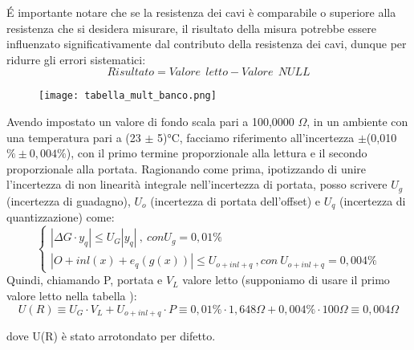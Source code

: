 \'E importante notare che se la resistenza dei cavi è comparabile o superiore alla resistenza che si desidera misurare, il risultato della misura potrebbe essere influenzato significativamente dal contributo della resistenza dei cavi, dunque per ridurre gli errori sistematici:
\begin{equation*}
    Risultato = Valore \ \ letto - Valore\ \ NULL
\end{equation*}

\begin{figure}[h]
    \centering
    \texttt{[image: tabella\_mult\_banco.png]}
    \label{fig:tab_mult_banco}
\end{figure}
\FloatBarrier

Avendo impostato un valore di fondo scala pari a 100,0000 $\Omega$, in un ambiente con una temperatura pari a (23 $\pm$ 5)°C, facciamo riferimento all'incertezza $\pm$(0,010 $\% \pm 0,004 \%$), con il primo termine proporzionale alla lettura e il secondo proporzionale alla portata.
Ragionando come prima, ipotizzando di unire l'incertezza di non linearità integrale nell'incertezza di portata, posso scrivere $U_g$ (incertezza di guadagno), $U_o$ (incertezza di portata dell'offset) e $U_q$ (incertezza di quantizzazione) come: 
\begin{equation}
\left\{\begin{array}{l}
| \Delta G \cdot y_q | \leq U_G |y_q| \ , \ con U_g=0,01\% \\ 
| O + inl(x) + e_q(g(x)) | \leq U_{o+inl+q} \ , con \ U_{o+inl+q}=0,004\%
\end{array}\right.
\end{equation}
Quindi, chiamando P, portata e $V_L$ valore letto (supponiamo di usare il primo valore letto nella tabella \label{mult_port}):
\begin{equation*}
    U(R) \equiv U_G \cdot V_L + U_{o+inl+q} \cdot P \equiv 0,01\% \cdot 1,648\Omega + 0,004 \% \cdot 100 \Omega \equiv 0,004 \Omega 
\end{equation*}

dove U(R) è stato arrotondato per difetto.

